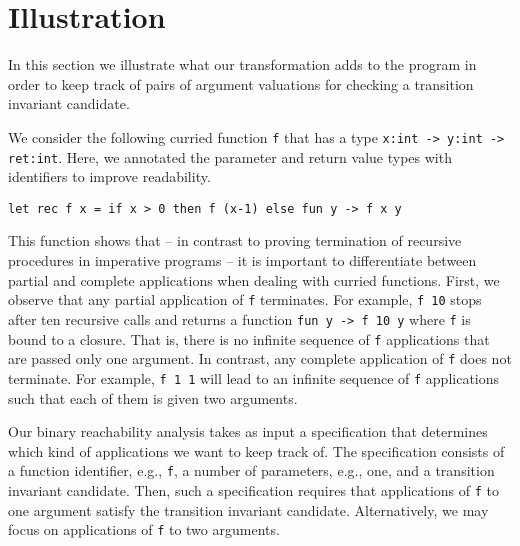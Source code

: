 \section{Illustration}

In this section we illustrate what our transformation adds to the
program in order to keep track of pairs of argument valuations for
checking a transition invariant candidate.

We consider the following curried function \texttt{f} that has a type
\texttt{x:int -> y:int -> ret:int}.
Here, we annotated the parameter and return value types with
identifiers to improve readability.
%
\begin{center}
\begin{minipage}[h]{.8\linewidth}
\begin{small}
\begin{verbatim}
let rec f x = if x > 0 then f (x-1) else fun y -> f x y
\end{verbatim}
\end{small}
\end{minipage}
\end{center}
%
This function shows that -- in contrast to proving termination of
recursive procedures in imperative programs -- it is important to
differentiate between partial and complete applications when dealing
with curried functions.
First, we observe that any partial application of \texttt{f}
terminates.
For example, \texttt{f 10} stops after ten recursive calls and returns
a function \texttt{fun y -> f 10 y} where \texttt{f} is bound to a
closure.
That is, there is no infinite sequence of \texttt{f} applications that
are passed only one argument.
In contrast, any complete application of \texttt{f} does not terminate.
For example, \texttt{f 1 1} will lead to an infinite sequence of
\texttt{f} applications such that each of them is given two arguments.

Our binary reachability analysis takes as input a specification that
determines which kind of applications we want to keep track of. 
The specification consists of a function identifier, e.g., \texttt{f},
a number of parameters, e.g., one, and a transition invariant candidate. 
Then, such a specification requires that applications of \texttt{f} to
one argument satisfy the transition invariant candidate.
Alternatively, we may focus on applications of \texttt{f} to two
arguments.

